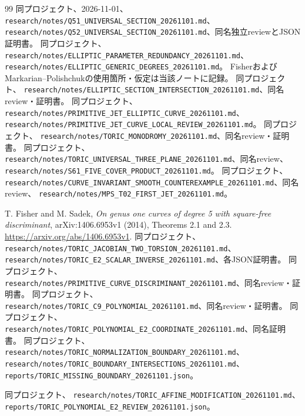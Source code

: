 \documentclass[11pt,a4paper]{ltjsarticle}
\theoremstyle{remark}
\begin{document}
\begin{thebibliography}{99}
 同プロジェクト、2026-11-01、
\nolinkurl{research/notes/Q51_UNIVERSAL_SECTION_20261101.md}、
\nolinkurl{research/notes/Q52_UNIVERSAL_SECTION_20261101.md}、同名独立reviewとJSON証明書。
 同プロジェクト、
\nolinkurl{research/notes/ELLIPTIC_PARAMETER_REDUNDANCY_20261101.md}、
\nolinkurl{research/notes/ELLIPTIC_GENERIC_DEGREES_20261101.md}。
FisherおよびMarkarian--Polishchukの使用箇所・仮定は当該ノートに記録。
 同プロジェクト、
\nolinkurl{research/notes/ELLIPTIC_SECTION_INTERSECTION_20261101.md}、同名review・証明書。
 同プロジェクト、
\nolinkurl{research/notes/PRIMITIVE_JET_ELLIPTIC_CURVE_20261101.md}、
\nolinkurl{research/notes/PRIMITIVE_JET_CURVE_LOCAL_REVIEW_20261101.md}。
 同プロジェクト、
\nolinkurl{research/notes/TORIC_MONODROMY_20261101.md}、同名review・証明書。
 同プロジェクト、
\nolinkurl{research/notes/TORIC_UNIVERSAL_THREE_PLANE_20261101.md}、同名review、
\nolinkurl{research/notes/S61_FIVE_COVER_PRODUCT_20261101.md}。
 同プロジェクト、
\nolinkurl{research/notes/CURVE_INVARIANT_SMOOTH_COUNTEREXAMPLE_20261101.md}、同名review、
\nolinkurl{research/notes/MPS_T02_FIRST_JET_20261101.md}。


 T. Fisher and M. Sadek,
\textit{On genus one curves of degree 5 with square-free discriminant},
arXiv:1406.6953v1 (2014), Theorems 2.1 and 2.3.
\url{https://arxiv.org/abs/1406.6953v1}.
 同プロジェクト、
\nolinkurl{research/notes/TORIC_JACOBIAN_TWO_TORSION_20261101.md}、
\nolinkurl{research/notes/TORIC_E2_SCALAR_INVERSE_20261101.md}、各JSON証明書。
 同プロジェクト、
\nolinkurl{research/notes/PRIMITIVE_CURVE_DISCRIMINANT_20261101.md}、同名review・証明書。
 同プロジェクト、
\nolinkurl{research/notes/TORIC_C9_POLYNOMIAL_20261101.md}、同名review・証明書。
 同プロジェクト、
\nolinkurl{research/notes/TORIC_POLYNOMIAL_E2_COORDINATE_20261101.md}、同名証明書。
 同プロジェクト、
\nolinkurl{research/notes/TORIC_NORMALIZATION_BOUNDARY_20261101.md}、
\nolinkurl{research/notes/TORIC_BOUNDARY_INTERSECTIONS_20261101.md}、
\nolinkurl{reports/TORIC_MISSING_BOUNDARY_20261101.json}。

 同プロジェクト、
\nolinkurl{research/notes/TORIC_AFFINE_MODIFICATION_20261101.md}、
\nolinkurl{reports/TORIC_POLYNOMIAL_E2_REVIEW_20261101.json}。


\end{thebibliography}
\end{document}
